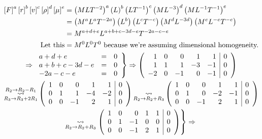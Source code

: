 \documentclass[a4paper, 11pt]{report}
\begin{document}
\begin{gather*}
	\begin{aligned}
			\left[ F \right]^a\left[ r \right]^b\left[ v \right]^c\left[ \rho \right]^d\left[ \mu \right]^e 
			&= \left( MLT^{-2} \right)^a \left( L \right)^b \left( LT^{-1} \right)^c \left( ML^{-3} \right)^d \left( ML^{-1}T^{-1} \right)^e \\
			&= \left( M^aL^aT^{-2a} \right) \left( L^b \right) \left( L^cT^{-c} \right) \left( M^dL^{-3d} \right) \left( M^eL^{-e}T^{-e} \right) \\
			&= M^{a+d+e}L^{a+b+c-3d-e}T^{-2a-c-e} \\
			\text{Let this} &= M^0L^0T^0 \text{ because we're assuming dimensional homogeneity.}
	\end{aligned}\\
	\Rightarrow
	\left.\begin{array}{lcc}
			a+d+e & = & 0 \\
			a + b + c - 3d - e & = & 0 \\
			-2a - c - e & = & 0 
	\end{array}\right\rbrace
	\Rightarrow 
	\left(\begin{array}{rrrrr|c}
			1 & 0 & 0 & 1 & 1 & 0 \\
			1 & 1 & 1 & -3 & -1 & 0 \\
			-2 & 0 & -1 & 0 & -1 & 0
	\end{array}\right)\\
	\mathop{\rightsquigarrow}_{R_3\rightarrow R_3+2R_1}^{R_2\rightarrow R_2 - R_1}
	\left(\begin{array}{rrrrr|c}
			1 & 0 & 0 & 1 & 1 & 0 \\
			0 & 1 & 1 & -4 & -2 & 0 \\
			0 & 0 & -1 & 2 & 1 & 0
	\end{array}\right)
	\mathop{\rightsquigarrow}_{R_2\rightarrow R_2 + R_3}
	\left(\begin{array}{rrrrr|c}
			1 & 0 & 0 & 1 & 1 & 0 \\
			0 & 1 & 0 & -2 & -1 & 0 \\
			0 & 0 & -1 & 2 & 1 & 0
	\end{array}\right) \\
	\mathop{\rightsquigarrow}_{R_2\rightarrow R_2 + R_3}
	\left.\left(\begin{array}{rrrrr|c}
			1 & 0 & 0 & 1 & 1 & 0 \\
			0 & 1 & -1 & 0 & 0 & 0 \\
			0 & 0 & -1 & 2 & 1 & 0
	\end{array}\right)\right\rbrace 
	\Rightarrow
	\begin{array}{lllll}

\end{array}
\end{gather*}
\end{document}
